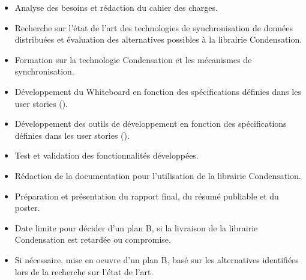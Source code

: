 \begin{itemize}
    \item Analyse des besoins et rédaction du cahier des charges.
    \item Recherche sur l'état de l'art des technologies de synchronisation de données distribuées et évaluation des alternatives possibles à la librairie Condensation.
    \item Formation sur la technologie Condensation et les mécanismes de synchronisation.
    \item Développement du Whiteboard en fonction des spécifications définies dans les user stories ().
    \item Développement des outils de développement en fonction des spécifications définies dans les user stories ().
    \item Test et validation des fonctionnalités développées.
    \item Rédaction de la documentation pour l'utilisation de la librairie Condensation.
    \item Préparation et présentation du rapport final, du résumé publiable et du poster.
    \item Date limite pour décider d'un plan B, si la livraison de la librairie Condensation est retardée ou compromise.
    \item Si nécessaire, mise en oeuvre d'un plan B, basé sur les alternatives identifiées lors de la recherche sur l'état de l'art.
\end{itemize}

